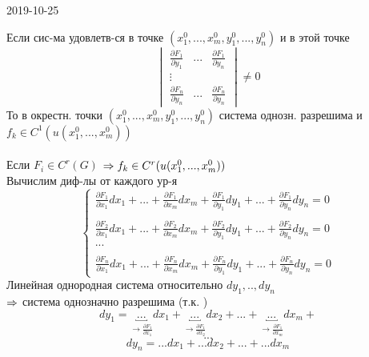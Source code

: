 \documentclass[matan.tex]{subfiles}
\begin{document}
\begin{lect}{2019-10-25}
    \begin{theorem}
        Если сис-ма удовлетв-ся в точке $(x_1^0, ..., x_m^0, y_1^0, ..., y_n^0)$ и в этой 
        точке 
        \[\begin{vmatrix}
            \frac{\partial F_1}{\partial y_1} & ... & \frac{\partial F_1}{\partial y_n}\\
            \vdots\\
            \frac{\partial F_n}{\partial y_n} & ... & \frac{\partial F_n}{\partial y_n}
        \end{vmatrix} \neq 0\]
        То в окрестн. точки $(x_1^0, ..., x_m^0, y_1^0, ..., y_n^0)$ система однозн. 
        разрешима и $f_k \in C^1(u(x_1^0, ..., x^0_m)) $\\
        \\
        Если $F_i \in C^r(G)$ \qq $\Rightarrow f_k \in C^r(u(x_1^0, ..., x_m^0))$\\
        Вычислим диф-лы от каждого ур-я
        \[\begin{cases} \displaystyle 
            \frac{\partial F_1}{\partial x_1} dx_1 + ... + \frac{\partial F_1}{
            \partial x_m}dx_m + \frac{\partial F_1}{\partial y_1}dy_1 + ... +
            \frac{\partial F_1}{\partial y_n}dy_n = 0\\\\ \displaystyle 
            \frac{\partial F_2}{\partial x_1} dx_1 + ... + \frac{\partial F_2}{
            \partial x_m}dx_m + \frac{\partial F_2}{\partial y_1}dy_1 + ... +
            \frac{\partial F_2}{\partial y_n}dy_n = 0\\
            ...\\\\\displaystyle 
            \frac{\partial F_n}{\partial x_1} dx_1 + ... + \frac{\partial F_n}{
            \partial x_m}dx_m + \frac{\partial F_n}{\partial y_1}dy_1 + ... +
            \frac{\partial F_n}{\partial y_n}dy_n = 0
        \end{cases}\]
        Линейная однородная система относительно $dy_1, .., dy_n$\\
        $\Rightarrow$ система однозначно разрешима (т.к. )
        \[dy_1 = \underbracket{...}_{\to \frac{\partial F_1}{\partial x_1}} dx_1 + 
            \underbracket{...}_{\to \frac{\partial F_1}{\partial x_2}} dx_2 + 
            ... +
            \underbracket{...}_{\to \frac{\partial F_1}{\partial x_m}} dx_m + 
        \]
        \[...\]
        \[dy_n = ... dx_1 + ... dx_2 + ... + ... dx_m\]
    \end{theorem}


\end{lect}
\end{document}
